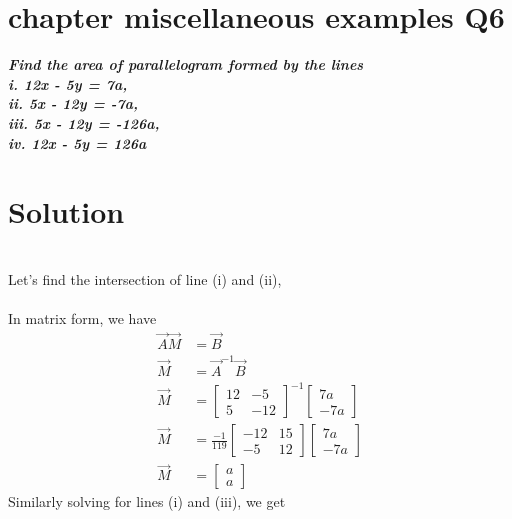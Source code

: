 \documentclass[journal,12pt,twocolumn]{IEEEtran}
\begin{document}
\section{ chapter   miscellaneous examples  Q6 }
\noindent
\textbf{\textsl{Find the area of parallelogram formed by the lines}}
$$$$
\textbf{\textsl{i. 12x - 5y = 7a,\\ ii. 5x - 12y = -7a,\\ iii. 5x - 12y = -126a,\\ iv. 12x - 5y = 126a}}
\noindent
\section*{\textbf{Solution}}
\noindent
\\
Let's find the intersection of line (i) and (ii),\\
\\
In matrix form, we have
\begin{align*}
\vec{A}\vec{M} &=\vec{B} \\
\vec{M} &= \vec{A}^{-1}\vec{B} \\
\vec{M}
& =
\begin{bmatrix}
12 & -5 \\
5 & -12 
\end{bmatrix}^{-1}
\begin{bmatrix}
7a\\ -7a
\end{bmatrix}  \\[6pt]
\vec{M}
& =
\frac{-1}{119}
\begin{bmatrix}
-12 & 15 \\
-5 & 12 
\end{bmatrix}
\begin{bmatrix}
7a \\ -7a
\end{bmatrix} \\[6pt]
\vec{M}
&=
\begin{bmatrix}
a \\ a
\end{bmatrix}
\end{align*}
Similarly solving for lines (i) and (iii), we get
\end{document}
